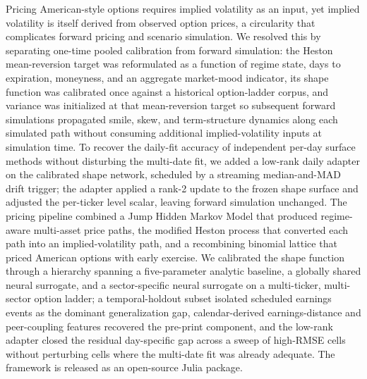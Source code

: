 Pricing American-style options requires implied volatility as an input, yet implied volatility is itself derived from observed option prices, a circularity that complicates forward pricing and scenario simulation. We resolved this by separating one-time pooled calibration from forward simulation: the Heston mean-reversion target was reformulated as a function of regime state, days to expiration, moneyness, and an aggregate market-mood indicator, its shape function was calibrated once against a historical option-ladder corpus, and variance was initialized at that mean-reversion target so subsequent forward simulations propagated smile, skew, and term-structure dynamics along each simulated path without consuming additional implied-volatility inputs at simulation time. To recover the daily-fit accuracy of independent per-day surface methods without disturbing the multi-date fit, we added a low-rank daily adapter on the calibrated shape network, scheduled by a streaming median-and-MAD drift trigger; the adapter applied a rank-2 update to the frozen shape surface and adjusted the per-ticker level scalar, leaving forward simulation unchanged. The pricing pipeline combined a Jump Hidden Markov Model that produced regime-aware multi-asset price paths, the modified Heston process that converted each path into an implied-volatility path, and a recombining binomial lattice that priced American options with early exercise. We calibrated the shape function through a hierarchy spanning a five-parameter analytic baseline, a globally shared neural surrogate, and a sector-specific neural surrogate on a multi-ticker, multi-sector option ladder; a temporal-holdout subset isolated scheduled earnings events as the dominant generalization gap, calendar-derived earnings-distance and peer-coupling features recovered the pre-print component, and the low-rank adapter closed the residual day-specific gap across a sweep of high-RMSE cells without perturbing cells where the multi-date fit was already adequate. The framework is released as an open-source Julia package.
